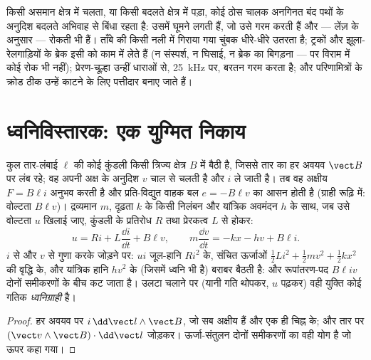 \begin{example}[भँवर धाराएँ]\label{ex:b1:induction:eddy}
किसी असमान क्षेत्र में चलता, या किसी बदलते क्षेत्र में पड़ा, कोई ठोस चालक
अनगिनत बंद पथों के अनुदिश बदलते अभिवाह से बिंधा रहता है: उसमें
\emph{} घूमने लगती हैं, जो उसे गरम करती हैं और --- लेंज़ के
अनुसार --- रोकती भी हैं। ताँबे की किसी नली में गिराया गया चुंबक धीरे-धीरे
उतरता है; ट्रकों और झूला-रेलगाड़ियों के ब्रेक इसी को काम में लेते हैं (न
संस्पर्श, न घिसाई, न ब्रेक का बिगड़ना --- पर विराम में कोई रोक भी नहीं);
प्रेरण-चूल्हा उन्हीं धाराओं से, \qty{25}{kHz} पर, बरतन गरम करता है; और
परिणामित्रों के क्रोड ठीक उन्हें काटने के लिए पत्तीदार बनाए जाते हैं।
\end{example}

\section{ध्वनिविस्तारक: एक युग्मित निकाय}

\begin{proposition}[त्रिज्य क्षेत्र में किसी कुंडली का विद्युत्-यांत्रिक युग्मन]\label{prop:b1:induction:loudspeaker}
कुल तार-लंबाई $\ell$ की कोई कुंडली किसी त्रिज्य क्षेत्र $B$ में बैठी है,
जिससे तार का हर अवयव $\vect B$ पर लंब रहे; वह अपनी अक्ष के अनुदिश
$v$ चाल से चलती है और $i$ ले जाती है। तब वह अक्षीय 
$F = B\ell i$ अनुभव करती है और प्रति-विद्युत वाहक बल $e = -B\ell v$ का आसन
होती है (ग्राही रूढ़ि में: वोल्टता $B\ell v$)। द्रव्यमान $m$, दृढ़ता
$k$ के किसी निलंबन और यांत्रिक अवमंदन $h$ के साथ, जब उसे वोल्टता $u$ खिलाई
जाए, कुंडली के प्रतिरोध $R$ तथा प्रेरकत्व $L$ से होकर:
\[
u = Ri + L\frac{\dd i}{\dd t} + B\ell v , \qquad
m\frac{\dd v}{\dd t} = -kx - hv + B\ell i .
\]
$i$ से और $v$ से गुणा करके जोड़ने पर:  $ui$
जूल-हानि $Ri^2$ के, संचित ऊर्जाओं
$\tfrac12Li^2 + \tfrac12mv^2 + \tfrac12kx^2$ की वृद्धि के, और यांत्रिक हानि
$hv^2$ के (जिसमें ध्वनि भी है) बराबर बैठती है: और रूपांतरण-पद $B\ell iv$
दोनों समीकरणों के बीच कट जाता है। उलटा चलाने पर (यानी गति थोपकर, $u$ पढ़कर)
वही युक्ति कोई गतिक \emph{ध्वनिग्राही} है।
\end{proposition}

\begin{proof}
हर अवयव पर  $i\,\dd\vect l\wedge\vect B$, जो सब अक्षीय हैं और एक ही
चिह्न के; और  तार पर $(\vect v\wedge\vect B)\cdot\dd\vect l$
जोड़कर। ऊर्जा-संतुलन दोनों समीकरणों का वही योग है जो ऊपर कहा गया।
\end{proof}

